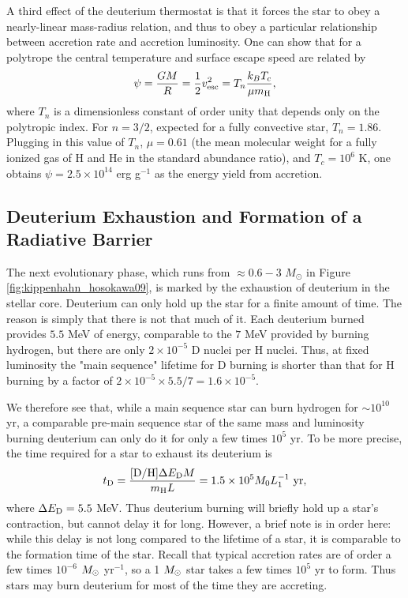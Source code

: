 A third effect of the deuterium thermostat is that it forces the star to obey a nearly-linear mass-radius relation, and thus to obey a particular relationship between accretion rate and accretion luminosity. One can show that for a polytrope the central temperature and surface escape speed are related by
\begin{equation}
\psi = \frac{GM}{R} = \frac{1}{2}v_{\rm esc}^2 = T_n \frac{k_B T_c}{\mu m_{\rm H}},
\end{equation}
where $T_n$ is a dimensionless constant of order unity that depends only on the polytropic index. For $n=3/2$, expected for a fully convective star, $T_n = 1.86$. Plugging in this value of $T_n$, $\mu=0.61$ (the mean molecular weight for a fully ionized gas of H and He in the standard abundance ratio), and $T_c = 10^6$ K, one obtains $\psi = 2.5\times 10^{14}$ erg g$^{-1}$ as the energy yield from accretion.

\subsection{Deuterium Exhaustion and Formation of a Radiative Barrier}

The next evolutionary phase, which runs from $\approx 0.6 - 3$ $M_\odot$ in Figure \ref{fig:kippenhahn_hosokawa09}, is marked by the exhaustion of deuterium in the stellar core. Deuterium can only hold up the star for a finite amount of time. The reason is simply that there is not that much of it. Each deuterium burned provides $5.5$ MeV of energy, comparable to the $7$ MeV provided by burning hydrogen, but there are only $2\times 10^{-5}$ D nuclei per H nuclei. Thus, at fixed luminosity the "main sequence" lifetime for D burning is shorter than that for H burning by a factor of $2\times 10^{-5} \times 5.5/7 = 1.6\times 10^{-5}$.

We therefore see that, while a main sequence star can burn hydrogen for $\sim 10^{10}$ yr, a comparable pre-main sequence star of the same mass and luminosity burning deuterium can only do it for only a few times $10^5$ yr. To be more precise, the time required for a star to exhaust its deuterium is
\begin{equation}
t_{\rm D} = \frac{[\mbox{D}/\mbox{H}] \Delta E_{\rm D} M}{m_{\rm H} L} = 1.5\times 10^5 M_{0} L_1^{-1}\mbox{ yr},
\end{equation}
where $\Delta E_{\rm D}= 5.5$ MeV. Thus deuterium burning will briefly hold up a star's contraction, but cannot delay it for long. However, a brief note is in order here: while this delay is not long compared to the lifetime of a star, it is comparable to the formation time of the star. Recall that typical accretion rates are of order a few times $10^{-6}$ $M_{\odot}$ yr$^{-1}$, so a 1 $M_{\odot}$ star takes a few times $10^5$ yr to form. Thus stars may burn deuterium for most of the time they are accreting.

